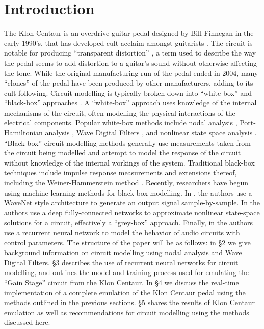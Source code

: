 \documentclass[twoside,a4paper]{article}
\begin{document}
\section{Introduction}
The Klon Centaur is an overdrive guitar pedal designed by Bill
Finnegan in the early 1990's, that has developed cult acclaim
amongst guitarists \cite{Finnegan}. The circuit is notable for
producing ``transparent distortion'' \cite{electrosmash},
a term used to describe the way the pedal seems to add distortion
to a guitar's sound without otherwise affecting the tone. While
the original manufacturing run of the pedal ended in 2004, many
``clones'' of the pedal have been produced by other manufacturers,
adding to its cult following.
\newline\newline
Circuit modelling is typically broken down into ``white-box'' and
``black-box'' approaches \cite{Germain}. A ``white-box'' approach
uses knowledge of the internal mechanisms of the circuit, often
modelling the physical interactions of the electrical components.
Popular white-box methods include nodal analysis \cite{Yeh},
Port-Hamiltonian analysis \cite{PortHamiltonian}, Wave Digital
Filters \cite{Fettweis,KurtThesis}, and nonlinear state space
analysis \cite{StateSpace}.
\newline\newline
``Black-box'' circuit modelling methods generally use measurements
taken from the circuit being modelled and attempt to model the
response of the circuit without knowledge of the internal workings
of the system. Traditional black-box techniques include impulse
response measurements \cite{sasp} and extensions thereof, including
the Weiner-Hammerstein method \cite{Germain}. Recently, researchers
have begun using machine learning methods for black-box modelling.
In \cite{WaveNetVA}, the authors use a WaveNet style architecture
to generate an output signal sample-by-sample. In \cite{NLML} the
authors use a deep fully-connected networks to approximate nonlinear
state-space solutions for a circuit, effectively a ``grey-box'' approach.
Finally, in \cite{VArnn} the authors use a recurrent neural network
to model the behavior of audio circuits with control parameters.
\newline\newline
The structure of the paper will be as follows: in \S2 we give
background information on circuit modelling using nodal analysis
and Wave Digital Filters. \S3 describes the use of recurrent neural
networks for circuit modelling, and outlines the model and training
process used for emulating the ``Gain Stage'' circuit from the Klon
Centaur. In \S4 we discuss the real-time implementation of a complete
emulation of the Klon Centaur pedal using the methods outlined in the
previous sections. \S5 shares the results of Klon Centaur emulation as
well as recommendations for circuit modelling using the methods
discussed here.
\end{document}
